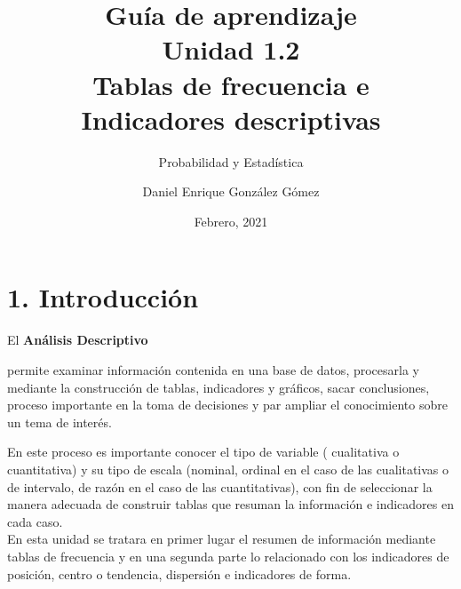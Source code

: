 \documentclass[base=hide,11pt]{elegantbook}
\title{Guía de  aprendizaje \\
	Unidad  1.2 \\
	Tablas de frecuencia e \\
	Indicadores descriptivas}
\subtitle{Probabilidad y Estadística}
\author{Daniel Enrique González Gómez}
\institute{Pontificia Universidad Javeriana Cali}
\date{Febrero, 2021}
\begin{document}

\maketitle

\frontmatter
%
\mainmatter

\section*{1. Introducción}

El {\bf Análisis Descriptivo} 

permite examinar información contenida en una base de datos, procesarla y mediante la construcción de tablas, indicadores y gráficos, sacar conclusiones, proceso importante en la toma de decisiones y par ampliar el conocimiento sobre un tema de interés.

En este proceso es importante conocer el  tipo de variable ( cualitativa o cuantitativa) y su tipo de escala (nominal, ordinal en el caso de  las cualitativas o de intervalo, de razón en  el caso de las cuantitativas), con  fin de seleccionar la manera adecuada de construir tablas que resuman la información e indicadores en cada caso. \\

En  esta unidad se tratara en primer lugar el resumen de información mediante tablas de frecuencia y en  una segunda parte lo relacionado con los indicadores de posición, centro o tendencia, dispersión e indicadores de forma.\\

\end{document}
